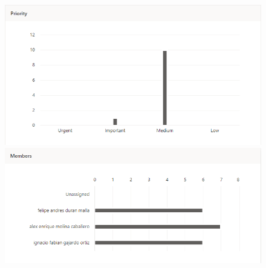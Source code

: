 \begin{figure}[htbp]
	\includegraphics[scale=0.7]{imgs/planner_priority.png}
	\includegraphics[scale=0.7]{imgs/planner_members.png}
\end{figure}